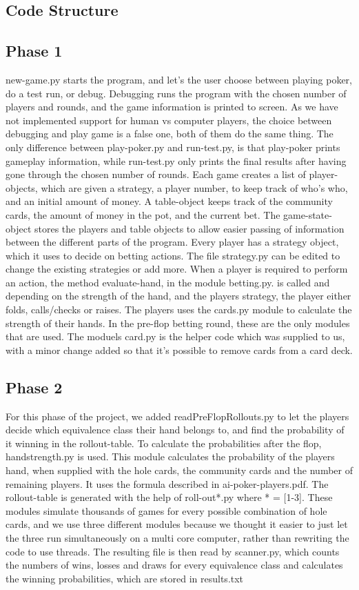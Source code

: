 \documentclass[titlepage]{article}
\begin{document}
\begin{itemize}
\section{Code Structure}
	\subsection{Phase 1}
		new-game.py starts the program, and let's the user choose between playing poker, do a test run, or debug. Debugging runs the program with the chosen number of players and rounds, and the game information is printed to screen. As we have not implemented support for human vs computer players, the choice between debugging and play game is a false one, both of them do the same thing. The only difference between play-poker.py and run-test.py, is that play-poker prints gameplay information, while run-test.py only prints the final results after having gone through the chosen number of rounds. Each game creates a list of player-objects, which are given a strategy, a player number, to keep track of who's who, and an initial amount of money. A table-object keeps track of the community cards, the amount of money in the pot, and the current bet. The game-state-object stores the players and table objects to allow easier passing of information between the different parts of the program. Every player has a strategy object, which it uses to decide on betting actions. The file strategy.py can be edited to change the existing strategies or add more. When a player is required to perform an action, the method evaluate-hand, in the module betting.py. is called and depending on the strength of the hand, and the players strategy, the player either folds, calls/checks or raises. The players uses the cards.py module to calculate the strength of their hands. In the pre-flop betting round, these are the only modules that are used. The moduels card.py is the helper code which was supplied to us, with a minor change added so that it's possible to remove cards from a card deck.
		
	\subsection{Phase 2}
		For this phase of the project, we added readPreFlopRollouts.py to let the players decide which equivalence class their hand belongs to, and find the probability of it winning in the rollout-table. To calculate the probabilities after the flop, handstrength.py is used. This module calculates the probability of the players hand, when supplied with the hole cards, the community cards and the number of remaining players. It uses the formula described in ai-poker-players.pdf. The rollout-table is generated with the help of roll-out*.py where * = [1-3]. These modules simulate thousands of games for every possible combination of hole cards, and we use three different modules because we thought it easier to just let the three run simultaneously on a multi core computer, rather than rewriting the code to use threads. The resulting file is then read by scanner.py, which counts the numbers of wins, losses and draws for every equivalence class and calculates the winning probabilities, which are stored in results.txt


\end{itemize}
\end{document}
